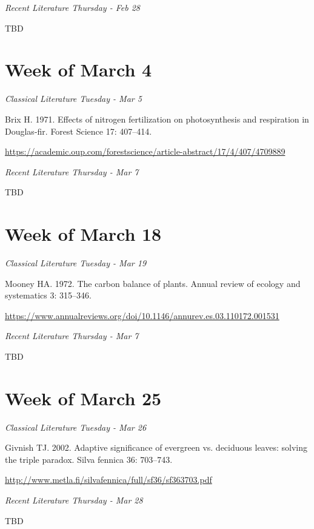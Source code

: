 \documentclass[12pt, notitlepage]{article}   	%
\begin{document}
{\textit{Recent Literature Thursday - Feb 28} \par
TBD \par

\section*{Week of March 4}
\textit{Classical Literature Tuesday - Mar 5} \par
Brix H. 1971. Effects of nitrogen fertilization on photosynthesis and respiration in 
Douglas-fir. Forest Science 17: 407–414. \par
\url{https://academic.oup.com/forestscience/article-abstract/17/4/407/4709889}

\textit{Recent Literature Thursday - Mar 7} \par
TBD \par


\section*{Week of March 18}
\textit{Classical Literature Tuesday - Mar 19} \par
Mooney HA. 1972. The carbon balance of plants. 
Annual review of ecology and systematics 3: 315–346. \par
\url{https://www.annualreviews.org/doi/10.1146/annurev.es.03.110172.001531}

\textit{Recent Literature Thursday - Mar 7} \par
TBD \par

\section*{Week of March 25}
\textit{Classical Literature Tuesday - Mar 26} \par
Givnish TJ. 2002. Adaptive significance of evergreen vs. deciduous leaves: 
solving the triple paradox. Silva fennica 36: 703–743. \par
\url{http://www.metla.fi/silvafennica/full/sf36/sf363703.pdf}

\textit{Recent Literature Thursday - Mar 28} \par
TBD \par

}
\end{document}
